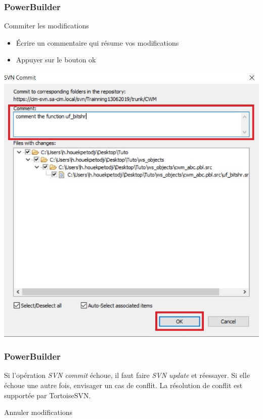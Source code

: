 \documentclass{beamer}
\begin{document}
\begin{frame}
\frametitle{PowerBuilder}
\begin{block}{ Commiter les modifications}
\begin{itemize}
\item Écrire un commentaire qui résume vos modifications
\item Appuyer sur le bouton ok
\end{itemize}

\end{block}
\includegraphics[scale=0.4]{../images/commit4.jpg}
\end{frame}

\begin{frame}
\frametitle{PowerBuilder}
Si l'opération \alert{\textit{SVN commit}} échoue, il faut faire \alert{\textit{SVN update}} et réessayer. Si elle échoue une autre fois, envisager un cas de conflit. La résolution de conflit est supportée par TortoiseSVN. 
\end{frame}

\begin{frame}
\begin{center}
\huge{Annuler modifications}
\end{center}
\end{frame}
\end{document}
